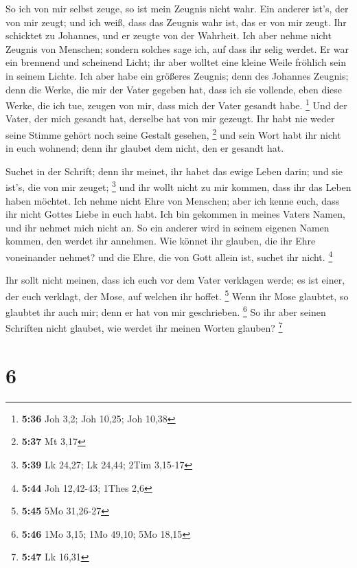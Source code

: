  So ich von mir selbst zeuge, so ist mein Zeugnis nicht
wahr.  Ein anderer ist's, der von mir zeugt; und ich
weiß, dass das Zeugnis wahr ist, das er von mir zeugt. 
Ihr schicktet zu Johannes, und er zeugte von der Wahrheit.
 Ich aber nehme nicht Zeugnis von Menschen; sondern
solches sage ich, auf dass ihr selig werdet.  Er war ein
brennend und scheinend Licht; ihr aber wolltet eine kleine Weile
fröhlich sein in seinem Lichte.  Ich aber habe ein
größeres Zeugnis; denn des Johannes Zeugnis; denn die Werke, die mir der
Vater gegeben hat, dass ich sie vollende, eben diese Werke, die ich tue,
zeugen von mir, dass mich der Vater gesandt habe. \footnote{\textbf{5:36}
  Joh 3,2; Joh 10,25; Joh 10,38}  Und der Vater, der mich
gesandt hat, derselbe hat von mir gezeugt. Ihr habt nie weder seine
Stimme gehört noch seine Gestalt gesehen, \footnote{\textbf{5:37} Mt
  3,17}  und sein Wort habt ihr nicht in euch wohnend;
denn ihr glaubet dem nicht, den er gesandt hat.

 Suchet in der Schrift; denn ihr meinet, ihr habet das
ewige Leben darin; und sie ist's, die von mir zeuget; \footnote{\textbf{5:39}
  Lk 24,27; Lk 24,44; 2Tim 3,15-17}  und ihr wollt nicht
zu mir kommen, dass ihr das Leben haben möchtet.  Ich
nehme nicht Ehre von Menschen;  aber ich kenne euch, dass
ihr nicht Gottes Liebe in euch habt.  Ich bin gekommen in
meines Vaters Namen, und ihr nehmet mich nicht an. So ein anderer wird
in seinem eigenen Namen kommen, den werdet ihr annehmen. 
Wie könnet ihr glauben, die ihr Ehre voneinander nehmet? und die Ehre,
die von Gott allein ist, suchet ihr nicht. \footnote{\textbf{5:44} Joh
  12,42-43; 1Thes 2,6}

 Ihr sollt nicht meinen, dass ich euch vor dem Vater
verklagen werde; es ist einer, der euch verklagt, der Mose, auf welchen
ihr hoffet. \footnote{\textbf{5:45} 5Mo 31,26-27}  Wenn
ihr Mose glaubtet, so glaubtet ihr auch mir; denn er hat von mir
geschrieben. \footnote{\textbf{5:46} 1Mo 3,15; 1Mo 49,10; 5Mo 18,15}
 So ihr aber seinen Schriften nicht glaubet, wie werdet
ihr meinen Worten glauben? \footnote{\textbf{5:47} Lk 16,31}

\hypertarget{section-3}{%
\section{6}\label{section-3}}

